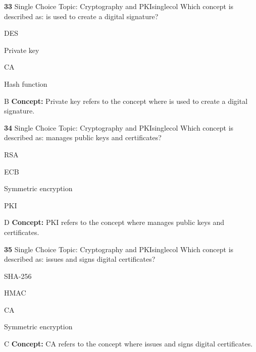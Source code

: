 \documentclass[10pt,a4paper]{article}
\begin{document}
\begin{qcard}{\color{white}\textbf{33} \hfill \small Single Choice \textbar{} Topic: Cryptography and PKI}{singlecol}
Which concept is described as: is used to create a digital signature?

\begin{qoptions}
\item DES
\item Private key
\item CA
\item Hash function
\end{qoptions}
\begin{explainbox}{B}
\textbf{Concept:} Private key refers to the concept where is used to create a digital signature.
\end{explainbox}
\end{qcard}

\begin{qcard}{\color{white}\textbf{34} \hfill \small Single Choice \textbar{} Topic: Cryptography and PKI}{singlecol}
Which concept is described as: manages public keys and certificates?

\begin{qoptions}
\item RSA
\item ECB
\item Symmetric encryption
\item PKI
\end{qoptions}
\begin{explainbox}{D}
\textbf{Concept:} PKI refers to the concept where manages public keys and certificates.
\end{explainbox}
\end{qcard}

\begin{qcard}{\color{white}\textbf{35} \hfill \small Single Choice \textbar{} Topic: Cryptography and PKI}{singlecol}
Which concept is described as: issues and signs digital certificates?

\begin{qoptions}
\item SHA-256
\item HMAC
\item CA
\item Symmetric encryption
\end{qoptions}
\begin{explainbox}{C}
\textbf{Concept:} CA refers to the concept where issues and signs digital certificates.
\end{explainbox}
\end{qcard}
\end{document}
